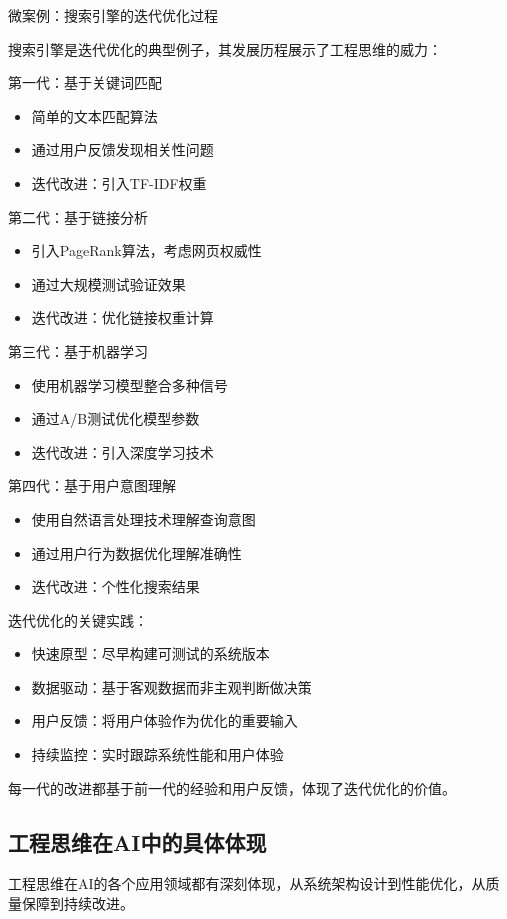 微案例：搜索引擎的迭代优化过程

搜索引擎是迭代优化的典型例子，其发展历程展示了工程思维的威力：

第一代：基于关键词匹配
\begin{itemize}
\item 简单的文本匹配算法
\item 通过用户反馈发现相关性问题
\item 迭代改进：引入TF-IDF权重
\end{itemize}

第二代：基于链接分析
\begin{itemize}
\item 引入PageRank算法，考虑网页权威性
\item 通过大规模测试验证效果
\item 迭代改进：优化链接权重计算
\end{itemize}

第三代：基于机器学习
\begin{itemize}
\item 使用机器学习模型整合多种信号
\item 通过A/B测试优化模型参数
\item 迭代改进：引入深度学习技术
\end{itemize}

第四代：基于用户意图理解
\begin{itemize}
\item 使用自然语言处理技术理解查询意图
\item 通过用户行为数据优化理解准确性
\item 迭代改进：个性化搜索结果
\end{itemize}

迭代优化的关键实践：
\begin{itemize}
\item 快速原型：尽早构建可测试的系统版本
\item 数据驱动：基于客观数据而非主观判断做决策
\item 用户反馈：将用户体验作为优化的重要输入
\item 持续监控：实时跟踪系统性能和用户体验
\end{itemize}

每一代的改进都基于前一代的经验和用户反馈，体现了迭代优化的价值。

\subsection{工程思维在AI中的具体体现}
 工程思维在AI的各个应用领域都有深刻体现，从系统架构设计到性能优化，从质量保障到持续改进。
 
